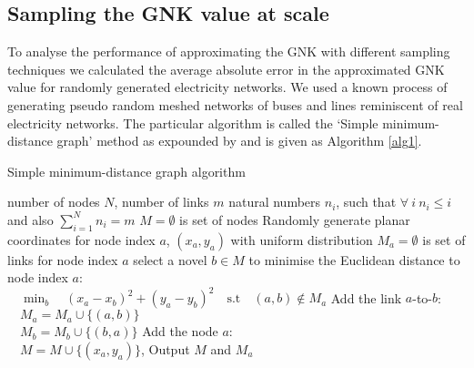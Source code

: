 \subsection{Sampling the GNK value at scale}\label{section:performance}

To analyse the performance of approximating the GNK with different sampling techniques we calculated the average absolute error in the approximated GNK value for randomly generated electricity networks.
We used a known process of generating pseudo random meshed networks of buses and lines reminiscent of real electricity networks. The particular algorithm is called the `Simple minimum-distance graph' method as expounded by \cite{hines1} and is given as Algorithm \ref{alg1}.

\begin{algorithm}[]
\caption{Simple minimum-distance graph algorithm}
\label{alg1}
\begin{algorithmic}
    \REQUIRE number of nodes $N$, number of links $m$
    \REQUIRE natural numbers $n_i$, such that $\forall~i~n_i\leq i$ and also $\sum_{i=1}^Nn_i=m$
    \STATE $M=\emptyset$ is set of nodes
        \STATE Randomly generate planar coordinates for node index $a$, $(x_a ,y_a)$ with uniform distribution
        \STATE $M_a=\emptyset$ is set of links for node index $a$
            \STATE select a novel $b\in M$ to minimise the Euclidean distance to node index $a$:\\ $\quad\min_b\quad (x_a-x_b)^2+(y_a-y_b)^2\quad\text{s.t}\quad (a, b)\notin M_a$
            \STATE Add the link $a$-to-$b$:\\ $\quad M_a=M_a\cup \{(a, b)\}$\\ $\quad M_b=M_b\cup \{(b, a)\}$
        \ENDFOR
        \STATE Add the node $a$:\\ $\quad M=M\cup \{(x_a ,y_a)\}$, 
    \ENDFOR
    \STATE Output $M$ and $M_a$ 
\end{algorithmic}
\end{algorithm}

